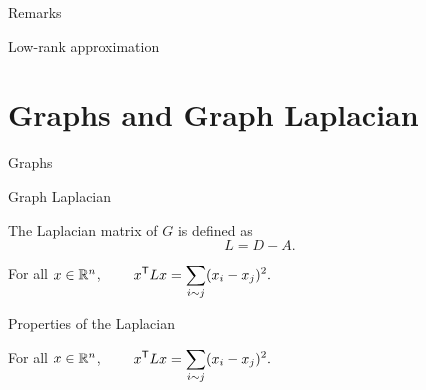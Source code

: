 \documentclass{beamer}
\begin{document}
\begin{frame}[t]{Remarks}
	\grid

\end{frame}

\begin{frame}[t]{Low-rank approximation}
	\grid

\end{frame}

\section{Graphs and Graph Laplacian}

\begin{frame}[t]{Graphs}
	\grid

\end{frame}

\begin{frame}[t]{Graph Laplacian}
	\grid

	\vspace{-0.4cm}
	\begin{definition}
		The Laplacian matrix of $G$ is defined as
		$$
		L = D - A.
		$$
	\end{definition}

	\pause
	\vspace{-0.5cm}
	\begin{exampleblock}{}
		For all $x \in \mathbb{R}^n$,
		$\displaystyle \qquad
		x^{\sT} L x = \sum_{i \sim j} (x_i - x_j)^2.
		\vspace{-0.1cm}
		$
	\end{exampleblock}
\end{frame}


\begin{frame}[t]{Properties of the Laplacian}
	\grid

	\vspace{-0.8cm}
	\begin{exampleblock}{}
		For all $x \in \mathbb{R}^n$,
		$\displaystyle \qquad
		x^{{\sf T}} L x = \sum_{i \sim j} (x_i - x_j)^2.
		$
	\end{exampleblock}


	\pause
\end{frame}
\end{document}
